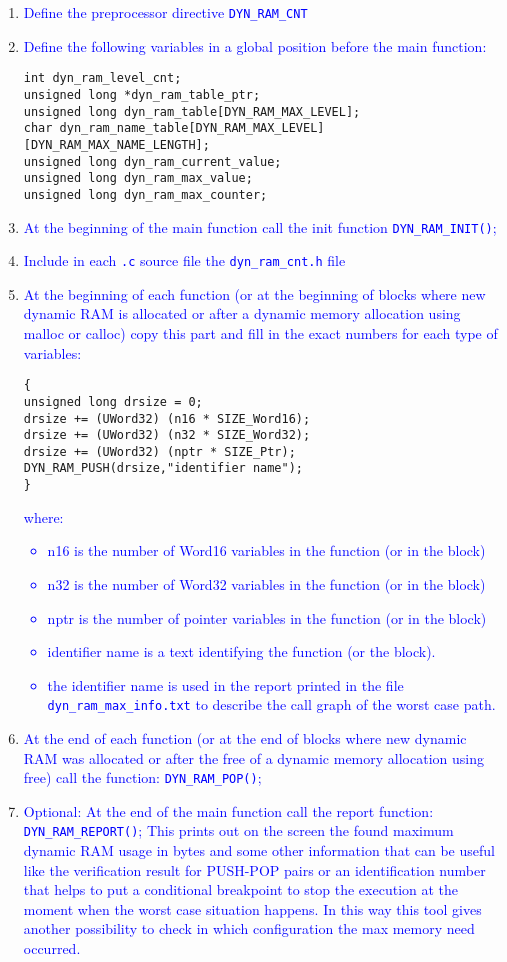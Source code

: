 \begin{enumerate}
\item \textcolor{blue}{%
Define the preprocessor directive {\tt DYN\_RAM\_CNT}
}
\item \textcolor{blue}{%
Define the following variables in a global position before the
main function:
}
\begin{verbatim}
int dyn_ram_level_cnt;
unsigned long *dyn_ram_table_ptr;
unsigned long dyn_ram_table[DYN_RAM_MAX_LEVEL];
char dyn_ram_name_table[DYN_RAM_MAX_LEVEL][DYN_RAM_MAX_NAME_LENGTH];
unsigned long dyn_ram_current_value;
unsigned long dyn_ram_max_value;
unsigned long dyn_ram_max_counter;
\end{verbatim}
\item \textcolor{blue}{%
At the beginning of the main function call the init function
{\tt DYN\_RAM\_INIT()};
}
\item \textcolor{blue}{%
Include in each {\tt .c} source file the {\tt dyn\_ram\_cnt.h} file
}
\item \textcolor{blue}{%
At the beginning of each function (or at the beginning of blocks
where new dynamic RAM is allocated or after a dynamic memory
allocation using malloc or calloc) copy this part and fill in the
exact numbers for each type of variables:
}
\begin{verbatim}
{
unsigned long drsize = 0;
drsize += (UWord32) (n16 * SIZE_Word16);
drsize += (UWord32) (n32 * SIZE_Word32);
drsize += (UWord32) (nptr * SIZE_Ptr);
DYN_RAM_PUSH(drsize,"identifier name");
}
\end{verbatim}
\textcolor{blue}{%
where:
\begin{itemize}
\item n16 is the number of Word16 variables in the function (or in the block)
\item n32 is the number of Word32 variables in the function (or in the block)
\item nptr is the number of pointer variables in the function (or in the block)
\item identifier name is a text identifying the function (or the
block).
\item the identifier name is used in the report printed in the file
{\tt dyn\_ram\_max\_info.txt} to describe the call graph of the worst case
path.
\end{itemize}
}
\item \textcolor{blue}{%
At the end of each function (or at the end of blocks where new
dynamic RAM was allocated or after the free of a dynamic memory
allocation using free) call the function: {\tt DYN\_RAM\_POP()};
}
\item \textcolor{blue}{%
Optional: At the end of the main function call the report
function: {\tt DYN\_RAM\_REPORT()}; This prints out on the screen
the found maximum dynamic RAM usage in bytes and some other
information that can be useful like the verification result for
PUSH-POP pairs or an identification number that helps to put a
conditional breakpoint to stop the execution at the moment when the
worst case situation happens. In this way this tool gives another
possibility to check in which configuration the max memory need
occurred.
}
\end{enumerate}


